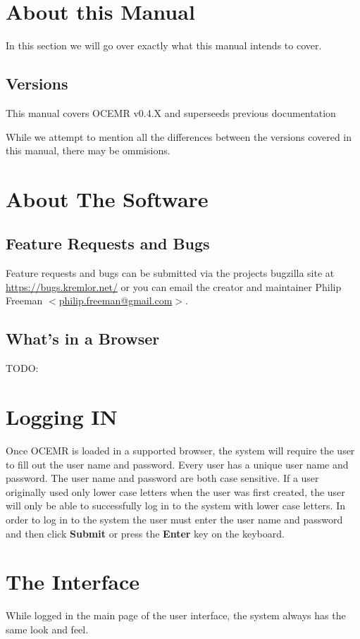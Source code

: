 \section{About this Manual}

In this section we will go over exactly what this manual intends to cover.

\subsection{Versions}
This manual covers OCEMR v0.4.X and superseeds previous documentation

While we attempt to mention all the differences between the versions
covered in this manual, there may be ommisions.

\section{About The Software}



\subsection{Feature Requests and Bugs}
Feature requests and bugs can be submitted via the projects bugzilla site at
\url{https://bugs.kremlor.net/} or you can email the creator and maintainer
Philip Freeman $<$\href{mailto:philip.freeman@gmail.com}{philip.freeman@gmail.com}$>$.

\subsection{What's in a Browser}
TODO:

\section{Logging IN}
Once OCEMR is loaded in a supported browser, the
system will require the user to fill out the user name and password.
Every user has a unique user name and password. The user name and
password are both case sensitive. If a user originally used only lower
case letters when the user was first created, the user will only be
able to successfully log in to the system with lower case letters. In
order to log in to the system the user must enter the user name and
password and then click \textbf{Submit }or press the \textbf{Enter} key
on the keyboard.

\section{The Interface}
While logged in the main page of the user interface, the system
always has the same look and feel. 
